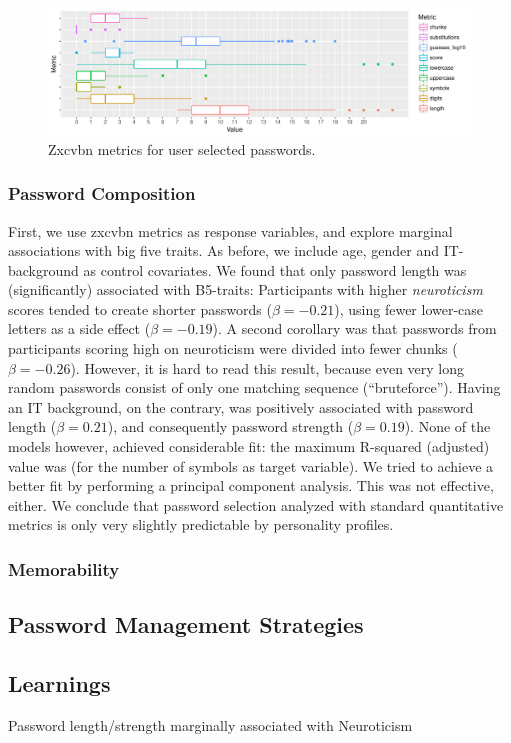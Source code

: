 \begin{figure}[tbph]
	\centering
	\includegraphics[width=1\linewidth]{figures/personality/study3-metrics-overview}
	\caption{\label{fig:personality:study3:metrics-overview} Zxcvbn metrics for user selected passwords.}
\end{figure}

\subsubsection{Password Composition}
First, we use zxcvbn metrics as response variables, and explore marginal associations with big five traits. As before, we include age, gender and IT-background as control covariates. We found that only password length was (significantly) associated with B5-traits: Participants with higher \textit{neuroticism} scores tended to create shorter passwords ($\beta = -0.21$), using fewer lower-case letters as a side effect ($\beta = -0.19$). A second corollary was that passwords from participants scoring high on neuroticism were divided into fewer chunks ($\beta=-0.26$). However, it is hard to read this result, because even very long random passwords consist of only one matching sequence (``bruteforce''). 
Having an IT background, on the contrary, was positively associated with password length ($\beta = 0.21$), and consequently password strength ($\beta=0.19$). None of the models however, achieved considerable fit: the maximum R-squared (adjusted) value was  (for the number of symbols as target variable). We tried to achieve a better fit by performing a principal component analysis. This was not effective, either. We conclude that password selection analyzed with standard quantitative metrics is only very slightly predictable by personality profiles. 

\subsubsection{Memorability}


\subsection{Password Management Strategies}

\subsection{Learnings}
Password length/strength marginally associated with Neuroticism
